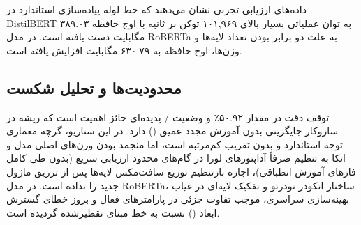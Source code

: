 داده‌های ارزیابی تجربی نشان می‌دهند که خط لوله پیاده‌سازی استاندارد در DistilBERT به توان عملیاتی بسیار بالای ۱۰۱,۹۶۹ توکن بر ثانیه با اوج حافظه ۳۸۹.۰۳ مگابایت دست یافته است. در مدل RoBERTa به علت دو برابر بودن تعداد لایه‌ها و وزن‌ها، اوج حافظه به ۶۳۰.۷۹ مگابایت افزایش یافته است.

\subsection{محدودیت‌ها و تحلیل شکست}
توقف دقت در مقدار ۵۰.۹۲٪ و وضعیت  /  پدیده‌ای حائز اهمیت است که ریشه در سازوکار جایگزینی بدون آموزش مجدد عمیق () دارد. در این سناریو، گرچه معماری توجه استاندارد و بدون تقریب کم‌مرتبه است، اما منجمد بودن وزن‌های اصلی مدل و اتکا به تنظیم صرفاً آداپتورهای لورا در گام‌های محدود ارزیابی سریع (بدون طی کامل فازهای آموزش انطباقی)، اجازه بازتنظیم توزیع سافت‌مکس لایه‌ها پس از تزریق ماژول جدید را نداده است. در مدل RoBERTa، ساختار انکودر تودرتو و تفکیک لایه‌ای در غیاب بهینه‌سازی سراسری، موجب تفاوت جزئی در پارامترهای فعال و بروز خطای گسترش ابعاد () نسبت به خط مبنای تقطیرشده گردیده است.
